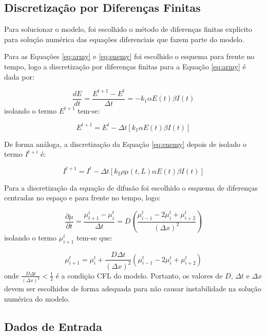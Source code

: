 \documentclass{article}
\begin{document}
\subsection{Discretização por Diferenças Finitas}

Para solucionar o modelo, foi escolhido o método de diferenças finitas explicito para solução numérica das equações diferenciais que fazem parte do modelo.

Para as Equações \ref{eq:army} e \ref{eq:enemy} foi escolhido o esquema para frente no tempo, logo a discretização por diferenças finitas para a Equação \ref{eq:army} é dada por:

\begin{equation}
	\frac{dE}{dt} = \frac{E^{t+1} - E^t}{\Delta t} = -k_1 \alpha E(t) \beta I(t)
\end{equation}
isolando o termo $E^{t+1}$ tem-se:

\begin{equation}
	E^{t+1} = E^t - \Delta t \left[k_1 \alpha E(t) \beta I(t) \right]
\end{equation}

De forma análoga, a discretização da Equação \ref{eq:enemy} depois de isolado o termo $I^{t+i}$ é:

\begin{equation}
	I^{t+1} = I^{t} - \Delta t \left[ k_2 \rho \mu(t,L) \alpha E(t) \beta I(t) \right]
\end{equation}

Para a discretização da equação de difusão foi escolhido o esquema de diferenças centradas no espaço e para frente no tempo, logo:

\begin{equation}
	\frac{\partial \mu}{\partial t} = \frac{\mu_{t+1}^{i} - \mu_i^t}{\Delta t} = D \left( \frac{\mu_{i-1}^t - 2\mu_i^t + \mu_{i+2}^{t}}{( \Delta x)^2 } \right)
\end{equation}
isolando o termo $\mu_{i+1}^t$ tem-se que:

\begin{equation}
	\mu_{i+1}^t = \mu_i^t + \frac{D \Delta t}{(\Delta x)^2} \left( \mu_{i-1}^t - 2\mu_i^t + \mu_{i+2}^{t}  \right)
\end{equation}
onde $\frac{D\Delta t}{(\Delta x)^2} < \frac{1}{2}$ é a condição CFL do modelo. Portanto, os valores de $D$, $\Delta t$ e $\Delta x$ devem ser escolhidos de forma adequada para não causar instabilidade na solução numérica do modelo.

\subsection{Dados de Entrada}
\end{document}
